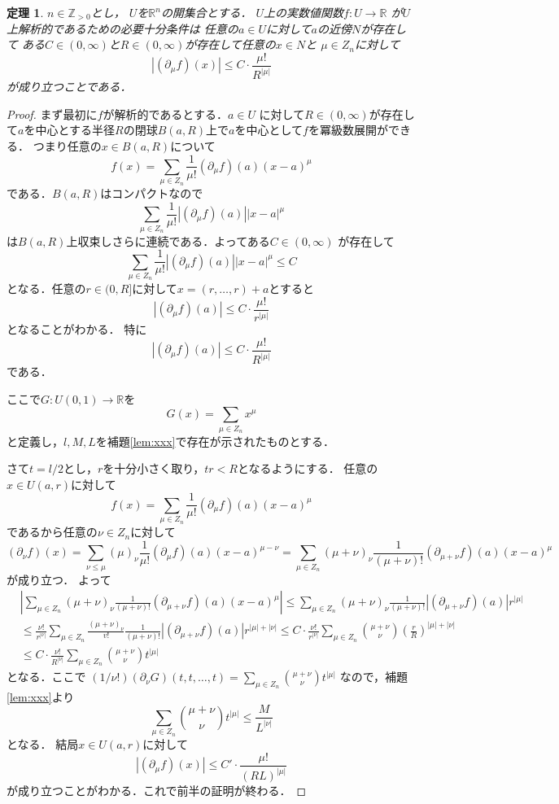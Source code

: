 \documentclass[leqno, a4paper, 12pt]{jsarticle}
\newtheorem{thm}{定理}
\newcommand{\zz}{\mathbb{Z}}
\newcommand{\rr}{\mathbb{R}}
\begin{document}
\begin{thm}
$n\in \zz_{>0}$とし，
$U$を$\rr^n$の開集合とする．
$U$上の実数値関数$f: U\to \rr$
が$U$上解析的であるための必要十分条件は
任意の$a\in U$に対して$a$の近傍$N$が存在して
ある$C\in (0, \infty)$と$R\in (0, \infty)$が存在して任意の$x\in N$と
$\mu\in Z_n$に対して
\[
|(\partial_{\mu}f)(x)|\le C\cdot\frac{\mu!}{R^{|\mu|}}
\]
が成り立つことである．
\end{thm}
\begin{proof}
まず最初に$f$が解析的であるとする．$a\in U$
に対して$R\in (0, \infty)$が存在して$a$を中心とする半径$R$の閉球$B(a, R)$上で$a$を中心として$f$を冪級数展開ができる．
つまり任意の$x\in B(a, R)$について
\[
f(x)=\sum_{\mu\in Z_n}\frac{1}{\mu!}(\partial_{\mu}f)(a)(x-a)^{\mu}
\]
である．$B(a, R)$はコンパクトなので
\[
\sum_{\mu\in Z_n}\frac{1}{\mu!}|(\partial_{\mu}f)(a)||x-a|^{\mu}
\]
は$B(a, R)$上収束しさらに連続である．よってある$C\in (0, \infty)$
が存在して
\[
\sum_{\mu\in Z_n}\frac{1}{\mu!}|(\partial_{\mu}f)(a)||x-a|^{\mu}\le C
\]
となる．任意の$r\in (0, R]$に対して$x=(r, \dots, r)+a$とすると
\[
|(\partial_{\mu}f)(a)|\le C\cdot\frac{\mu!}{r^{|\mu|}}
\]
となることがわかる．
特に
\[
|(\partial_{\mu}f)(a)|\le C\cdot\frac{\mu!}{R^{|\mu|}}
\]
である．

ここで$G: U(0, 1)\to \rr$を
\[
G(x)=\sum_{\mu\in Z_n}x^{\mu}
\]
と定義し，$l, M, L$を補題\ref{lem:xxx}で存在が示されたものとする．

さて$t=l/2$とし，$r$を十分小さく取り，$tr<R$となるようにする．
任意の$x\in U(a, r)$に対して
\[
f(x)=\sum_{\mu\in Z_n}\frac{1}{\mu!}(\partial_{\mu}f)(a)(x-a)^{\mu}
\]
であるから任意の$\nu\in Z_n$に対して
\[
(\partial_{\nu}f)(x)=\sum_{\nu\le \mu}(\mu)_{\nu}\frac{1}{\mu!}(\partial_{\mu}f)(a)(x-a)^{\mu-\nu}
=\sum_{\mu\in Z_n}(\mu+\nu)_{\nu}\frac{1}{(\mu+\nu)!}(\partial_{\mu+\nu}f)(a)(x-a)^{\mu}
\]
が成り立つ．
よって
\begin{align*}
&\left|\sum_{\mu\in Z_n}(\mu+\nu)_{\nu}\frac{1}{(\mu+\nu)!}(\partial_{\mu+\nu}f)(a)(x-a)^{\mu}\right|
\le 
\sum_{\mu\in Z_n}(\mu+\nu)_{\nu}\frac{1}{(\mu+\nu)!}
|(\partial_{\mu+\nu}f)(a)|r^{|\mu|}\
\\
&\le \frac{\nu !}{r^{|\nu|}}
\sum_{\mu\in Z_n}\frac{(\mu+\nu)_{\nu}}{v!}\frac{1}{(\mu+\nu)!}
|(\partial_{\mu+\nu}f)(a)|r^{|\mu|+|\nu|}
\le
 C\cdot \frac{\nu !}{r^{|\nu|}}
\sum_{\mu\in Z_n}\binom{\mu+\nu}{\nu}\left(\frac{r}{R}\right)^{|\mu|+|\nu|}\\
&\le 
C\cdot \frac{\nu!}{R^{|\nu|}}
\sum_{\mu\in Z_n}\binom{\mu+\nu}{\nu}t^{|\mu|}
\end{align*}
となる．ここで
$(1/\nu!)(\partial_{\nu}G)(t, t, \dots, t)=\sum_{\mu\in Z_n}\binom{\mu+\nu}{\nu}t^{|\mu|}$
なので，補題\ref{lem:xxx}より
\[
\sum_{\mu\in Z_n}\binom{\mu+\nu}{\nu}t^{|\mu|}\le \frac{M}{L^{|\nu|}}
\]
となる．
結局$x\in U(a, r)$に対して
\[
|(\partial_{\mu}f)(x)|\le C'\cdot\frac{\mu!}{(RL)^{|\mu|}}
\]
が成り立つことがわかる．これで前半の証明が終わる．


\end{proof}
\end{document}
